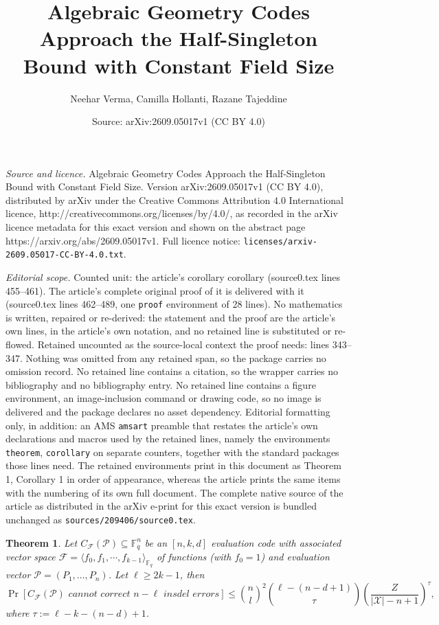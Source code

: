 \documentclass[10pt,a4paper]{amsart}
\title{Algebraic Geometry Codes Approach the Half-Singleton Bound with Constant Field Size}
\author{Neehar Verma, Camilla Hollanti, Razane Tajeddine}
\date{Source: arXiv:2609.05017v1 (CC BY 4.0)}
\newtheorem{theorem}{Theorem}
\newcommand{\F}{\mathbb{F}}
\begin{document}
\maketitle

\noindent\emph{Source and licence.} Algebraic Geometry Codes Approach the Half-Singleton Bound with Constant Field Size. Version arXiv:2609.05017v1 (CC BY 4.0), distributed by arXiv under the Creative Commons Attribution 4.0 International licence, http://creativecommons.org/licenses/by/4.0/, as recorded in the arXiv licence metadata for this exact version and shown on the abstract page https://arxiv.org/abs/2609.05017v1. Full licence notice: \texttt{licenses/arxiv-2609.05017-CC-BY-4.0.txt}.\par\smallskip

\noindent\textit{Editorial scope.} Counted unit: the article's corollary corollary (source0.tex lines 455--461). The article's complete original proof of it is delivered with it (source0.tex lines 462--489, one \texttt{proof} environment of 28 lines). No mathematics is written, repaired or re-derived: the statement and the proof are the article's own lines, in the article's own notation, and no retained line is substituted or re-flowed.  Retained uncounted as the source-local context the proof needs: lines 343--347.  Nothing was omitted from any retained span, so the package carries no omission record.  No retained line contains a citation, so the wrapper carries no bibliography and no bibliography entry.  No retained line contains a figure environment, an image-inclusion command or drawing code, so no image is delivered and the package declares no asset dependency.  Editorial formatting only, in addition: an AMS \texttt{amsart} preamble that restates the article's own declarations and macros used by the retained lines, namely the environments \texttt{theorem}, \texttt{corollary} on separate counters, together with the standard packages those lines need.  The retained environments print in this document as Theorem 1, Corollary 1 in order of appearance, whereas the article prints the same items with the numbering of its own full document.  The complete native source of the article as distributed in the arXiv e-print for this exact version is bundled unchanged as \texttt{sources/209406/source0.tex}.
\begin{theorem} \label{ultimate}
    Let $C_{\mathcal{F}}(\mathcal{P}) \subseteq \F_q^n$ be an $[n,k,d]$ evaluation code with associated vector space $\mathcal{F} = \langle f_0, f_1, \dotsm , f_{k-1}\rangle_{\F_q}$ of functions (with $f_0 = 1$) and evaluation vector $\mathcal{P} = (P_1, \dots, P_n)$. Let $\ell \geq 2k-1$, then
    $$\Pr[C_{\mathcal{F}}(\mathcal{P}) \textit{ cannot correct $n-\ell$ insdel errors}] \leq \binom{n}{l}^2 \binom{\ell - (n - d + 1)}{\tau} \left(\frac{Z}{|\mathcal{X}| - n + 1}\right)^\tau,$$
    where $\tau  := \ell - k - (n - d) + 1$.
\end{theorem}
\end{document}
